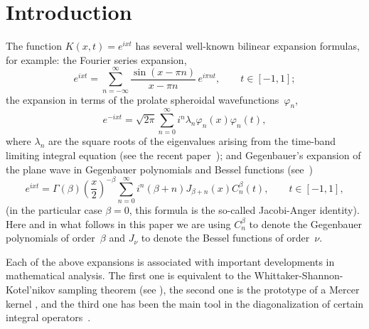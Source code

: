 \documentclass[11pt,a4paper]{amsart}
\theoremstyle{plain}
\theoremstyle{definition}
\begin{document}
\maketitle


\section{Introduction}

The function $K(x,t) = e^{ixt}$ has several well-known bilinear expansion
formulas, for example: the Fourier series expansion,
\begin{equation}
\label{eq:expsamp}
  e^{ixt} = \sum_{n = -\infty}^{\infty}
  \frac{\sin (x-\pi n)}{x-\pi n} \,e^{i\pi nt},
  \qquad t \in [-1,1];
\end{equation}
the expansion in terms of the prolate spheroidal wavefunctions~$\varphi_{n}$,
\begin{equation}
\label{eq:prolate}
  e^{-ixt} = \sqrt{2\pi}\sum_{n = 0}^{\infty}i^{n}
  \lambda_{n}\varphi_{n}(x)\varphi_{n}(t),
\end{equation}
where $\lambda_{n}$ are the square roots of the eigenvalues arising from
the time-band limiting integral equation (see the recent paper~\cite{Zayed});
and Gegenbauer's expansion of the plane wave in Gegenbauer polynomials 
and Bessel functions (see~\cite[\S\,4.8, formula (4.8.3), p.~116]{Ism})
\begin{equation}
\label{eq:geg}
  e^{ixt} = \Gamma(\beta) \left(\frac{x}{2}\right)^{-\beta}
  \sum_{n = 0}^{\infty} i^{n}(\beta+n)J_{\beta+n}(x)C_{n}^{\beta}(t),
  \qquad t \in [-1,1],
\end{equation}
(in the particular case $\beta=0$, this formula is the so-called
Jacobi-Anger identity). Here and in what follows in this paper we 
are using $C_{n}^{\beta}$ to denote the Gegenbauer polynomials 
of order~$\beta$ and $J_\nu$ to denote the Bessel functions of 
order~$\nu$.

Each of the above expansions is associated with important developments in
mathematical analysis. The first one is equivalent to the
Whittaker-Shannon-Kotel'nikov sampling theorem (see \cite[Ch.~2]{Zayed-book}), 
the second one is the prototype of a Mercer kernel \cite{Zayed}, 
and the third one has been the main tool in the diagonalization of 
certain integral operators~\cite{IZ}. 
\end{document}
